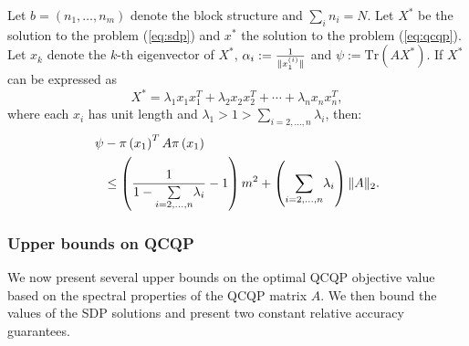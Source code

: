 \begin{proposition}
Let $b = \left(n_1,\ldots,n_m\right)$ denote the block structure and $ \sum_i n_i = N $.
Let $X^*$ be the solution to the problem (\ref{eq:sdp}) and $x^{*}$ the solution to the problem (\ref{eq:qcqp}).
Let $x_k$ denote the $k$-th eigenvector of $X^*$,
$\alpha_i := \frac{1}{\lVert x_1^{(i)}\rVert}$ and
$\psi := \mathrm{Tr}\left(A X^{*}\right)$. %
If $X^*$ can be expressed as
$$X^* = \lambda_1  x_1 x_1^T + \lambda_2 x_2 x_2^T + \cdots + \lambda_n x_n x_n^T,$$
where each $x_i$ has unit length and $\lambda_1 > 1 >  \underset{i=2,\ldots, n}{\sum} \lambda_i$,
 then:
\begin{align*}
\psi &- \pi\left(x_1\right)^T A \pi\left(x_1\right) \\ &\leq  \left(\frac{1}{1- \underset{i=2,\ldots, n}{\sum} \lambda_i} -1\right)  m^2 + \left(\underset{i=2,\ldots, n}{\sum} \lambda_i\right) \lVert A\rVert_2.
\end{align*}
\end{proposition}


\subsubsection{Upper bounds on QCQP}\label{subsubsec:upperbounds}
We now present several upper bounds on the optimal QCQP objective
value based on the spectral
properties of the QCQP matrix $A$. We then bound the
values of the SDP solutions and present two constant relative accuracy
guarantees.

